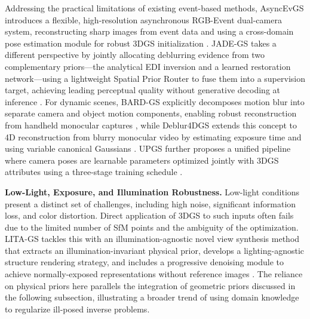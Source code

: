 \documentclass[11pt]{article}
\begin{document}
Addressing the practical limitations of existing event-based methods, AsyncEvGS introduces a flexible, high-resolution asynchronous RGB-Event dual-camera system, reconstructing sharp images from event data and using a cross-domain pose estimation module for robust 3DGS initialization \cite{ref289}. JADE-GS takes a different perspective by jointly allocating deblurring evidence from two complementary priors---the analytical EDI inversion and a learned restoration network---using a lightweight Spatial Prior Router to fuse them into a supervision target, achieving leading perceptual quality without generative decoding at inference \cite{ref290}. For dynamic scenes, BARD-GS explicitly decomposes motion blur into separate camera and object motion components, enabling robust reconstruction from handheld monocular captures \cite{ref291}, while Deblur4DGS extends this concept to 4D reconstruction from blurry monocular video by estimating exposure time and using variable canonical Gaussians \cite{ref292}. UPGS further proposes a unified pipeline where camera poses are learnable parameters optimized jointly with 3DGS attributes using a three-stage training schedule \cite{ref271}.

\textbf{Low-Light, Exposure, and Illumination Robustness.} Low-light conditions present a distinct set of challenges, including high noise, significant information loss, and color distortion. Direct application of 3DGS to such inputs often fails due to the limited number of SfM points and the ambiguity of the optimization. LITA-GS tackles this with an illumination-agnostic novel view synthesis method that extracts an illumination-invariant physical prior, develops a lighting-agnostic structure rendering strategy, and includes a progressive denoising module to achieve normally-exposed representations without reference images \cite{ref293}. The reliance on physical priors here parallels the integration of geometric priors discussed in the following subsection, illustrating a broader trend of using domain knowledge to regularize ill-posed inverse problems.
\end{document}
